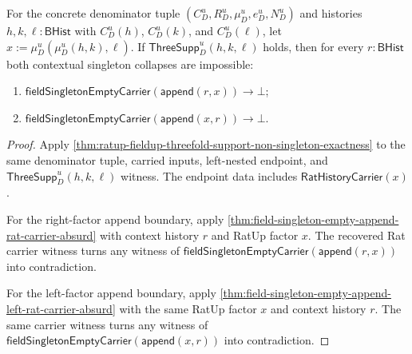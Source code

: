 \begin{theorem}
\label{thm:ratup-fieldup-threefold-support-contextual-separation}
For the concrete denominator tuple $(C_D^u,R_D^u,\mu_D^u,e_D^u,N_D^u)$ and
histories $h,k,\ell:\mathsf{BHist}$ with $C_D^u(h)$, $C_D^u(k)$, and
$C_D^u(\ell)$, let $x:=\mu_D^u(\mu_D^u(h,k),\ell)$. If
$\mathsf{ThreeSupp}_D^u(h,k,\ell)$ holds, then for every
$r:\mathsf{BHist}$ both contextual singleton collapses are impossible:
\begin{enumerate}
  \item $\mathsf{fieldSingletonEmptyCarrier}(\mathsf{append}(r,x))\to\bot$;
  \item $\mathsf{fieldSingletonEmptyCarrier}(\mathsf{append}(x,r))\to\bot$.
\end{enumerate}
\end{theorem}
\begin{proof}
Apply
\autoref{thm:ratup-fieldup-threefold-support-non-singleton-exactness} to the
same denominator tuple, carried inputs, left-nested endpoint, and
$\mathsf{ThreeSupp}_D^u(h,k,\ell)$ witness. The endpoint data includes
$\mathsf{RatHistoryCarrier}(x)$.

For the right-factor append boundary, apply
\autoref{thm:field-singleton-empty-append-rat-carrier-absurd} with context
history $r$ and RatUp factor $x$. The recovered Rat carrier witness turns any
witness of $\mathsf{fieldSingletonEmptyCarrier}(\mathsf{append}(r,x))$ into
contradiction.

For the left-factor append boundary, apply
\autoref{thm:field-singleton-empty-append-left-rat-carrier-absurd} with the
same RatUp factor $x$ and context history $r$. The same carrier witness turns
any witness of $\mathsf{fieldSingletonEmptyCarrier}(\mathsf{append}(x,r))$
into contradiction.
\end{proof}

